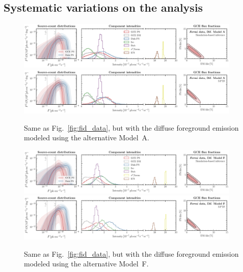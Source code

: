 \documentclass[prd,aps,10pt,nofootinbib,twocolumn,superscriptaddress,preprintnumbers,balancelastpage,longbibliography,floatfix]{revtex4-2}
\begin{document}
\subsection{Systematic variations on the analysis}
\label{sec:systematics}

%
\begin{figure}[!htbp]
\centering
\includegraphics[width=0.95\textwidth]{data_fid_sbi_modelA.pdf}
\includegraphics[width=0.95\textwidth]{data_fid_nptf_modelA.pdf}
\caption{Same as Fig.~\ref{fig:fid_data}, but with the diffuse foreground emission modeled using the alternative {Model~A}.}
\label{fig:fid_data_modelA}
\end{figure}
%

%
\begin{figure}[!htbp]
\centering
\includegraphics[width=0.95\textwidth]{data_fid_sbi_modelF.pdf}
\includegraphics[width=0.95\textwidth]{data_fid_nptf_modelF.pdf}
\caption{Same as Fig.~\ref{fig:fid_data}, but with the diffuse foreground emission modeled using the alternative {Model~F}.}
\label{fig:fid_data_modelF}
\end{figure}
%
\end{document}
